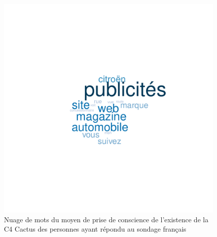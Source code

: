 \documentclass[12pt]{article}\usepackage[]{graphicx}\usepackage[]{color}
\makeatletter
\def\maxwidth{ %
  \ifdim\Gin@nat@width>\linewidth
    \linewidth
  \else
    \Gin@nat@width
  \fi
}
\newenvironment{knitrout}{}{} %
\makeatother
\begin{document}
\begin{knitrout}
\color{fgcolor}\begin{figure}[H]
\includegraphics[width=\maxwidth]{figure/means_fr-1} \caption[Nuage de mots du moyen de prise de conscience de l'existence de la C4 Cactus des personnes ayant répondu au sondage français]{Nuage de mots du moyen de prise de conscience de l'existence de la C4 Cactus des personnes ayant répondu au sondage français}\label{fig:means fr}
\end{figure}


\end{knitrout}
\end{document}
